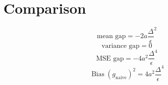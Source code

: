 \documentclass{article}
\begin{document}
\section*{Comparison}
\begin{dmath*}
\text{mean gap} = - 2 a {\frac{\Delta}{\epsilon}}^{2}
\end{dmath*}
\begin{dmath*}
\text{variance gap} = 0
\end{dmath*}
\begin{dmath*}
\text{MSE gap} = - 4 a^{2} {\frac{\Delta}{\epsilon}}^{4}
\end{dmath*}
\begin{dmath*}
\operatorname{Bias}(g_{\mathrm{naive}})^2 = 4 a^{2} {\frac{\Delta}{\epsilon}}^{4}
\end{dmath*}
\end{document}
